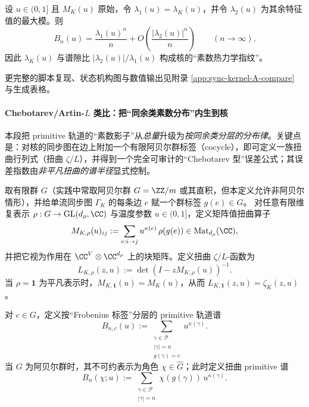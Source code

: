 \begin{theorem}\label{thm:kernel-weighted-prime-orbit}
设 $u\in(0,1]$ 且 $M_K(u)$ 原始，令 $\lambda_1(u)=\lambda_K(u)$，并令 $\lambda_2(u)$ 为其余特征值的最大模。则
\[
B_n(u)=\frac{\lambda_1(u)^n}{n}+O\!\left(\frac{|\lambda_2(u)|^n}{n}\right)\qquad(n\to\infty).
\]
因此 \(\lambda_K(u)\) 与谱隙比 \( |\lambda_2(u)|/\lambda_1(u)\) 构成核的“素数热力学指纹”。
\end{theorem}

更完整的脚本复现、状态机构图与数值输出见附录 \ref{app:sync-kernel-A-compare} 与生成表格。

\paragraph{Chebotarev/Artin-\texorpdfstring{$L$}{L} 类比：把“同余类素数分布”内生到核}
本段把 primitive 轨道的“素数影子”从\emph{总量}升级为\emph{按同余类分层的分布律}。关键点是：对核的同步图在边上附加一个有限阿贝尔群标签（cocycle），即可定义一族扭曲行列式（扭曲 $\zeta/L$），并得到一个完全可审计的“Chebotarev 型”误差公式；其误差指数由\emph{非平凡扭曲的谱半径}显式控制。

\begin{definition}[有限群标签与扭曲矩阵族]\label{def:kernel-group-twist}
取有限群 $G$（实践中常取阿贝尔群 $G=\ZZ/m$ 或其直积，但本定义允许非阿贝尔情形），并给单流同步图 $\Gamma_K$ 的每条边 $e$ 赋一个群标签 $g(e)\in G$。
对任意有限维复表示 $\rho:G\to\mathrm{GL}(d_\rho,\CC)$ 与温度参数 $u\in(0,1]$，定义矩阵值扭曲算子
\[
M_{K,\rho}(u)_{ij}:=\sum_{e:i\to j}u^{\kappa(e)}\,\rho(g(e))\in\mathrm{Mat}_{d_\rho}(\CC),
\]
并把它视为作用在 $\CC^{V}\otimes\CC^{d_\rho}$ 上的块矩阵。定义扭曲 $\zeta/L$-函数为
\[
L_{K,\rho}(z,u):=\det(I-zM_{K,\rho}(u))^{-1}.
\]
当 $\rho=\mathbf{1}$ 为平凡表示时，$M_{K,\mathbf{1}}(u)=M_K(u)$，从而 $L_{K,\mathbf{1}}(z,u)=\zeta_K(z,u)$。
\end{definition}

\begin{definition}\label{def:kernel-chebotarev-spectrum}
对 $c\in G$，定义按“Frobenius 标签”分层的 primitive 轨道谱
\[
B_{n,c}(u):=\sum_{\substack{\gamma\in\mathcal{P}\\|\gamma|=n\\g(\gamma)=c}}u^{\kappa(\gamma)}.
\]
当 $G$ 为阿贝尔群时，其不可约表示为角色 $\chi\in\widehat G$；此时定义扭曲 primitive 谱
\[
B_n(\chi;u):=\sum_{\substack{\gamma\in\mathcal{P}\\|\gamma|=n}}\chi(g(\gamma))\,u^{\kappa(\gamma)}.
\]
\end{definition}

